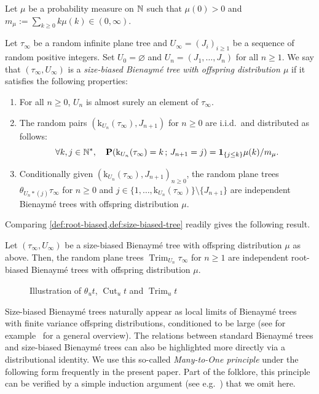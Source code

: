 \documentclass[11pt,reqno]{amsart}
\newcommand{\rk}{\mathrm{k}}
\newcommand{\Cut}{\operatorname{Cut}}
\newcommand{\Trim}{\operatorname{Trim}}
\begin{document}
Let $\mu$ be a probability measure on $\mathbb{N}$ such that $\mu(0)>0$ and $m_\mu:=\sum_{k\geq 0}k\mu(k)\in(0,\infty)$.

\begin{defn}\label{def:size-biased-tree}
Let $\tau_\infty$ be a random infinite plane tree and $U_\infty=(J_i)_{i\geq 1}$ be a sequence of random positive integers. Set $U_0=\varnothing$ and $U_n=(J_1,\ldots,J_n)$ for all $n\geq 1$. We say that $(\tau_\infty,U_\infty)$ is a \emph{size-biased Bienaymé tree with offspring distribution $\mu$} if it satisfies the following properties:
\begin{enumerate}
    \item[(a)] For all $n\geq 0$, $U_n$ is almost surely an element of $\tau_\infty$.
    \item[(b)] The random pairs $(\rk_{U_n}(\tau_\infty),J_{n+1})$ for $n\geq 0$ are i.i.d.~and distributed as follows:
    \[\forall k,j\in\N^*,\quad \P(\rk_{U_n}(\tau_\infty)=k\, ;\, J_{n+1}=j)=\I{j\leq k}\mu(k)/m_\mu.\]
    \item[(c)] Conditionally given $(\rk_{U_n}(\tau_\infty),J_{n+1})_{n\geq 0}$, the random plane trees $\theta_{U_n*(j)}\tau_\infty$ for $n\geq 0$ and $j\in \{1,\ldots,\rk_{U_n}(\tau_\infty)\}\setminus\{J_{n+1}\}$ are independent Bienaymé trees with offspring distribution $\mu$.
\end{enumerate}
\end{defn}

Comparing \cref{def:root-biased,def:size-biased-tree} readily gives the following result.

\begin{prop}
\label{root-biased_VS_size-biased}
Let $(\tau_\infty,U_\infty)$ be a size-biased Bienaymé tree with offspring distribution $\mu$ as above. Then, the random plane trees $\Trim_{U_n}\tau_\infty$ for $n\geq 1$ are independent root-biased Bienaymé trees with offspring distribution $\mu$.
\end{prop}

\begin{figure}
    \centering
    
    \caption{Illustration of $\theta_u t$, $\Cut_u t$ and $\Trim_u t$}
    \label{fig:basic-defs}
\end{figure}

Size-biased Bienaymé trees naturally appear as local limits of Bienaymé trees with finite variance offspring distributions, conditioned to be large (see for example~\cite{abraham2015introduction} for a general overview). The relations between standard Bienaymé trees and size-biased Bienaymé trees can also be highlighted more directly via a distributional identity. We use this so-called \emph{Many-to-One principle} under the following form frequently in the present paper. Part of the folklore, this principle can be verified by a simple induction argument (see e.g.~\cite[Equation (24)]{duquesne09}) that we omit here.
\end{document}
